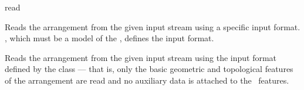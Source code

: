 
\ccRefPageBegin

\begin{ccRefFunction}{read}


   {Reads the arrangement  from the given input stream using a
    specific input format. , which must be a model of the
    , defines the input format.}

   {Reads the arrangement  from the given input stream using the
    input format defined by the  class --- that is,
    only the basic geometric and topological features of the arrangement are
    read and no auxiliary data is attached to the \dcel\ features.}

\end{ccRefFunction}

\ccRefPageEnd
